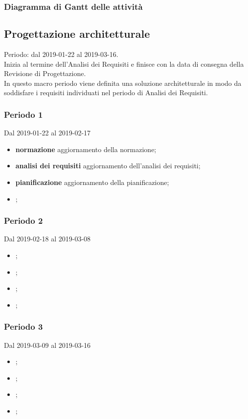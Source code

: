 \subsubsection{Diagramma di Gantt delle attività}


\subsection{Progettazione architetturale}
Periodo: dal 2019-01-22 al 2019-03-16.
\\Inizia al termine dell'Analisi dei Requisiti e finisce con la data di consegna della Revisione di Progettazione.
\\In questo macro periodo viene definita una soluzione architetturale in modo da soddisfare i requisiti individuati nel periodo di Analisi dei Requisiti.

\subsubsection{Periodo 1} 
Dal 2019-01-22 al 2019-02-17
\begin{itemize}
	\item \textbf{normazione} aggiornamento della normazione;
	\item \textbf{analisi dei requisiti} aggiornamento dell'analisi dei requisiti;
	\item \textbf{pianificazione} aggiornamento della pianificazione;
	\item \textbf{};
\end{itemize}
\subsubsection{Periodo 2} 
Dal 2019-02-18 al 2019-03-08
\begin{itemize}
	\item \textbf{};
	\item \textbf{};
	\item \textbf{};
	\item \textbf{};
\end{itemize}
\subsubsection{Periodo 3} 
Dal 2019-03-09 al 2019-03-16
\begin{itemize}
	\item \textbf{};
	\item \textbf{};
	\item \textbf{};
	\item \textbf{};
\end{itemize}
